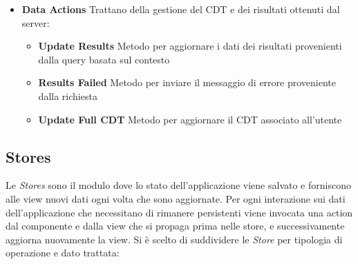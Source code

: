 \begin{itemize}
\begin{itemize}
	\end{itemize}
	\item \textbf{Data Actions}
	Trattano della gestione del CDT e dei risultati ottenuti dal server:
	\begin{itemize}
		\item \textbf{Update Results}
		Metodo per aggiornare i dati dei risultati provenienti dalla query basata sul contesto
		\item \textbf{Results Failed}
		Metodo per inviare il messaggio di errore proveniente dalla richiesta
		\item \textbf{Update Full CDT}
		Metodo per aggiornare il CDT associato all'utente
	\end{itemize}
\end{itemize}

\subsection{Stores}\label{sec:action-store}

Le \emph{Stores} sono il modulo dove lo stato dell'applicazione viene salvato e forniscono alle view nuovi dati ogni volta che sono aggiornate. 
Per ogni interazione sui dati dell'applicazione che necessitano di rimanere persistenti viene invocata una action dal componente e dalla view che si propaga prima nelle store, e successivamente aggiorna nuovamente la view.
Si è scelto di suddividere le \emph{Store} per tipologia di operazione e dato trattata:

